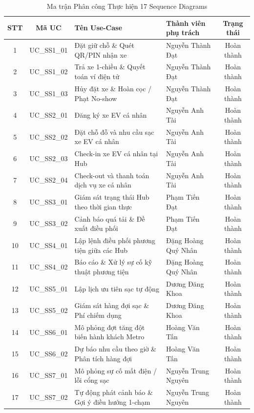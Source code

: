\documentclass[12pt,a4paper]{article}
\begin{document}
\begin{table}[H]
    \centering
    \small
    \renewcommand{\arraystretch}{1.25}
    \caption{Ma trận Phân công Thực hiện 17 Sequence Diagrams}
    \label{tab:seq-assignment}
    \begin{tabularx}{\textwidth}{|c|c|X|l|c|}
        \hline
        \textbf{STT} & \textbf{Mã UC} & \textbf{Tên Use-Case} & \textbf{Thành viên phụ trách} & \textbf{Trạng thái} \\
        \hline
        1 & UC\_SS1\_01 & Đặt giữ chỗ \& Quét QR/PIN nhận xe & Nguyễn Thành Đạt & Hoàn thành \\
        2 & UC\_SS1\_02 & Trả xe 1-chiều \& Quyết toán ví điện tử & Nguyễn Thành Đạt & Hoàn thành \\
        3 & UC\_SS1\_03 & Hủy đặt xe \& Hoàn cọc / Phạt No-show & Nguyễn Thành Đạt & Hoàn thành \\
        \hline
        4 & UC\_SS2\_01 & Đăng ký xe EV cá nhân & Nguyễn Anh Tài & Hoàn thành \\
        5 & UC\_SS2\_02 & Đặt chỗ đỗ và nhu cầu sạc xe EV cá nhân & Nguyễn Anh Tài & Hoàn thành \\
        6 & UC\_SS2\_03 & Check-in xe EV cá nhân tại Hub & Nguyễn Anh Tài & Hoàn thành \\
        7 & UC\_SS2\_04 & Check-out và thanh toán dịch vụ xe cá nhân & Nguyễn Anh Tài & Hoàn thành \\
        \hline
        8 & UC\_SS3\_01 & Giám sát trạng thái Hub theo thời gian thực & Phạm Tiến Đạt & Hoàn thành \\
        9 & UC\_SS3\_02 & Cảnh báo quá tải \& Đề xuất điều phối & Phạm Tiến Đạt & Hoàn thành \\
        \hline
        10 & UC\_SS4\_01 & Lập lệnh điều phối phương tiện giữa các Hub & Đặng Hoàng Quý Nhân & Hoàn thành \\
        11 & UC\_SS4\_02 & Báo cáo \& Xử lý sự cố kỹ thuật phương tiện & Đặng Hoàng Quý Nhân & Hoàn thành \\
        \hline
        12 & UC\_SS5\_01 & Lập lịch ưu tiên sạc tự động & Dương Đăng Khoa & Hoàn thành \\
        13 & UC\_SS5\_02 & Giám sát hàng đợi sạc \& Phí chiếm dụng & Dương Đăng Khoa & Hoàn thành \\
        \hline
        14 & UC\_SS6\_01 & Mô phỏng đợt tăng đột biến hành khách Metro & Hoàng Văn Tấn & Hoàn thành \\
        15 & UC\_SS6\_02 & Dự báo nhu cầu theo giờ \& Phân tích hàng đợi & Hoàng Văn Tấn & Hoàn thành \\
        \hline
        16 & UC\_SS7\_01 & Mô phỏng sự cố mất điện / lỗi cổng sạc & Nguyễn Trung Nguyên & Hoàn thành \\
        17 & UC\_SS7\_02 & Tự động phát cảnh báo \& Gợi ý điều hướng 1-chạm & Nguyễn Trung Nguyên & Hoàn thành \\
        \hline
    \end{tabularx}
\end{table}
\end{document}
